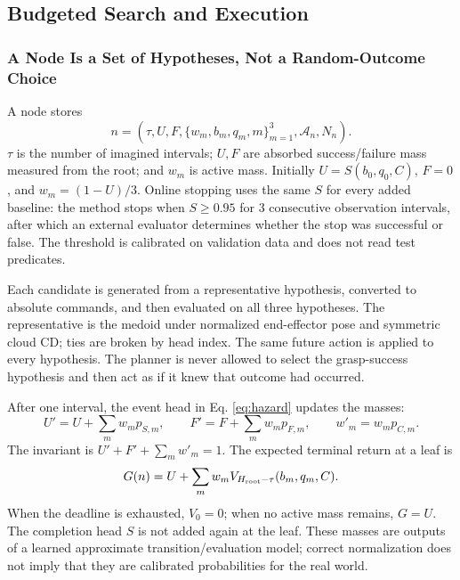 \documentclass[
  10pt,
]{article}
\begin{document}
\hypertarget{budgeted-search-vuxe0-thux1ef1c-thi}{%
\subsection{Budgeted Search and Execution}\label{budgeted-search-vuxe0-thux1ef1c-thi}}

\hypertarget{node-luxe0-tux1eadp-giux1ea3-thuyux1ebft-khuxf4ng-luxe0-lux1ef1a-chux1ecdn-kux1ebft-quux1ea3-ngux1eabu-nhiuxean}{%
\subsubsection{A Node Is a Set of Hypotheses, Not a Random-Outcome Choice}\label{node-luxe0-tux1eadp-giux1ea3-thuyux1ebft-khuxf4ng-luxe0-lux1ef1a-chux1ecdn-kux1ebft-quux1ea3-ngux1eabu-nhiuxean}}

A node stores
\begin{equation}\label{eq:node}
n=(\tau,U,F,\{w_m,b_m,q_m,m\}_{m=1}^3,\mathcal A_n,N_n).
\end{equation}
\(\tau\) is the number of imagined intervals; \(U,F\) are absorbed success/failure mass measured from the root; and \(w_m\) is active mass. Initially \(U=S(b_0,q_0,C)\), \(F=0\), and \(w_m=(1-U)/3\). Online stopping uses the same \(S\) for every added baseline: the method stops when \(S\geq0.95\) for 3 consecutive observation intervals, after which an external evaluator determines whether the stop was successful or false. The threshold is calibrated on validation data and does not read test predicates.

Each candidate is generated from a representative hypothesis, converted to absolute commands, and then evaluated on all three hypotheses. The representative is the medoid under normalized end-effector pose and symmetric cloud CD; ties are broken by head index. The same future action is applied to every hypothesis. The planner is never allowed to select the grasp-success hypothesis and then act as if it knew that outcome had occurred.

After one interval, the event head in Eq. \eqref{eq:hazard} updates the masses:
\begin{equation}\label{eq:backupmass}
U'=U+\sum_mw_mp_{S,m},\qquad
F'=F+\sum_mw_mp_{F,m},\qquad
w'_m=w_mp_{C,m}.
\end{equation}
The invariant is \(U'+F'+\sum_m w'_m=1\). The expected terminal return at a leaf is
\begin{equation}\label{eq:return}
G(n)=U+\sum_mw_mV_{H_{\rm root}-\tau}(b_m,q_m,C).
\end{equation}
When the deadline is exhausted, \(V_0=0\); when no active mass remains, \(G=U\). The completion head \(S\) is not added again at the leaf. These masses are outputs of a learned approximate transition/evaluation model; correct normalization does not imply that they are calibrated probabilities for the real world.
\end{document}
